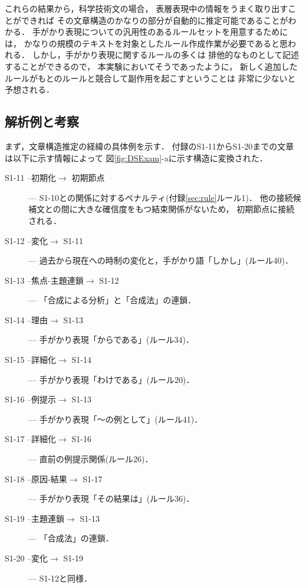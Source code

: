 これらの結果から，科学技術文の場合，
表層表現中の情報をうまく取り出すことができれば
その文章構造のかなりの部分が自動的に推定可能であることがわかる．
手がかり表現についての汎用性のあるルールセットを用意するためには，
かなりの規模のテキストを対象としたルール作成作業が必要であると思われる．
しかし，手がかり表現に関するルールの多くは
排他的なものとして記述することができるので，
本実験においてそうであったように，
新しく追加したルールがもとのルールと競合して副作用を起こすということは
非常に少ないと予想される．

\subsection{解析例と考察}

まず，文章構造推定の経緯の具体例を示す．
付録のS1-11からS1-20までの文章は以下に示す情報によって
図\ref{fig:DSExam}-aに示す構造に変換された．
\begin{description}

\item[S1-11 --初期化$\rightarrow$ 初期節点] --- 
S1-10との関係に対するペナルティ(付録\ref{sec:rule}ルール1)．
他の接続候補文との間に大きな確信度をもつ結束関係がないため，
初期節点に接続される．

\item[S1-12 --変化$\rightarrow$ S1-11] --- 
過去から現在への時制の変化と，手がかり語「しかし」(ルール40)．

\item[S1-13 --焦点-主題連鎖$\rightarrow$ S1-12] --- 
「合成による分析」と「合成法」の連鎖．

\item[S1-14 --理由$\rightarrow$ S1-13] --- 
手がかり表現「からである」(ルール34)．

\item[S1-15 --詳細化$\rightarrow$ S1-14] --- 
手がかり表現「わけである」(ルール20)．

\item[S1-16 --例提示$\rightarrow$ S1-13] --- 
手がかり表現「〜の例として」(ルール41)．

\item[S1-17 --詳細化$\rightarrow$ S1-16] --- 
直前の例提示関係(ルール26)．

\item[S1-18 --原因-結果$\rightarrow$ S1-17] --- 
手がかり表現「その結果は」(ルール36)．

\item[S1-19 --主題連鎖$\rightarrow$ S1-13] --- 
「合成法」の連鎖．

\item[S1-20 --変化$\rightarrow$ S1-19] --- S1-12と同様．

\end{description}

